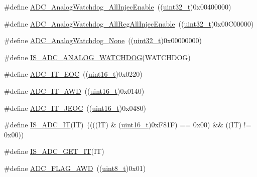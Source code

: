 \begin{DoxyCompactItemize}
\item 
\#define \hyperlink{group___a_d_c__analog__watchdog__selection_gae4d6a7ebb136d924f0c8bad2cbac0574}{A\+D\+C\+\_\+\+Analog\+Watchdog\+\_\+\+All\+Injec\+Enable}~((\hyperlink{_p_e___types_8h_a33594304e786b158f3fb30289278f5af}{uint32\+\_\+t})0x00400000)
\item 
\#define \hyperlink{group___a_d_c__analog__watchdog__selection_ga25a299f4493aaae316521351198df084}{A\+D\+C\+\_\+\+Analog\+Watchdog\+\_\+\+All\+Reg\+All\+Injec\+Enable}~((\hyperlink{_p_e___types_8h_a33594304e786b158f3fb30289278f5af}{uint32\+\_\+t})0x00\+C00000)
\item 
\#define \hyperlink{group___a_d_c__analog__watchdog__selection_ga91f69979e0e449fef5a8b225a21e3eb9}{A\+D\+C\+\_\+\+Analog\+Watchdog\+\_\+\+None}~((\hyperlink{_p_e___types_8h_a33594304e786b158f3fb30289278f5af}{uint32\+\_\+t})0x00000000)
\item 
\#define \hyperlink{group___a_d_c__analog__watchdog__selection_ga53ffa30f756569194342bfba80165544}{I\+S\+\_\+\+A\+D\+C\+\_\+\+A\+N\+A\+L\+O\+G\+\_\+\+W\+A\+T\+C\+H\+D\+OG}(W\+A\+T\+C\+H\+D\+OG)
\item 
\#define \hyperlink{group___a_d_c__interrupts__definition_ga0ad335d835f54415194d448019569e00}{A\+D\+C\+\_\+\+I\+T\+\_\+\+E\+OC}~((\hyperlink{_p_e___types_8h_a1f1825b69244eb3ad2c7165ddc99c956}{uint16\+\_\+t})0x0220)
\item 
\#define \hyperlink{group___a_d_c__interrupts__definition_ga2f5c7f9900c24250a0c6ccaa7cbca946}{A\+D\+C\+\_\+\+I\+T\+\_\+\+A\+WD}~((\hyperlink{_p_e___types_8h_a1f1825b69244eb3ad2c7165ddc99c956}{uint16\+\_\+t})0x0140)
\item 
\#define \hyperlink{group___a_d_c__interrupts__definition_gad439fc0cd69706704d47aeabfeddb631}{A\+D\+C\+\_\+\+I\+T\+\_\+\+J\+E\+OC}~((\hyperlink{_p_e___types_8h_a1f1825b69244eb3ad2c7165ddc99c956}{uint16\+\_\+t})0x0480)
\item 
\#define \hyperlink{group___a_d_c__interrupts__definition_gaf5f8d35930becff402eeb8220641432f}{I\+S\+\_\+\+A\+D\+C\+\_\+\+IT}(IT)~((((IT) \& (\hyperlink{_p_e___types_8h_a1f1825b69244eb3ad2c7165ddc99c956}{uint16\+\_\+t})0x\+F81\+F) == 0x00) \&\& ((\+I\+T) != 0x00))
\item 
\#define \hyperlink{group___a_d_c__interrupts__definition_gacae69f04de1a0033f065864d868c006e}{I\+S\+\_\+\+A\+D\+C\+\_\+\+G\+E\+T\+\_\+\+IT}(IT)
\item 
\#define \hyperlink{group___a_d_c__flags__definition_gadb75a4b430fb84950232b7a8f3a6a877}{A\+D\+C\+\_\+\+F\+L\+A\+G\+\_\+\+A\+WD}~((\hyperlink{_p_e___types_8h_aba7bc1797add20fe3efdf37ced1182c5}{uint8\+\_\+t})0x01)

\end{DoxyCompactItemize}
